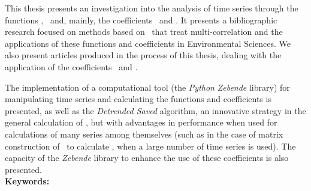 \begin{thesisabastract}

This thesis presents an investigation into the analysis of time series through the functions \dfa, \dcca~and, mainly, the coefficients \pdcca~and \dmc. It presents a bibliographic research focused on methods based on \dfa~that treat multi-correlation and the applications of these functions and coefficients in Environmental Sciences. We also present articles produced in the process of this thesis, dealing with the application of the coefficients \pdcca~and \dmc.

The implementation of a computational tool (the \emph{Python} \emph{Zebende} library) for manipulating time series and calculating the functions and coefficients is presented, as well as the \emph{Detrended Saved} algorithm, an innovative strategy in the general calculation of \dcca, but with advantages in performance when used for calculations of many series among themselves (such as in the case of matrix construction of \pdcca~to calculate \dmc, when a large number of time series is used). The capacity of the \emph{Zebende} library to enhance the use of these coefficients is also presented.\\

\textbf{Keywords:} \ppgmkeywords

\end{thesisabastract}
